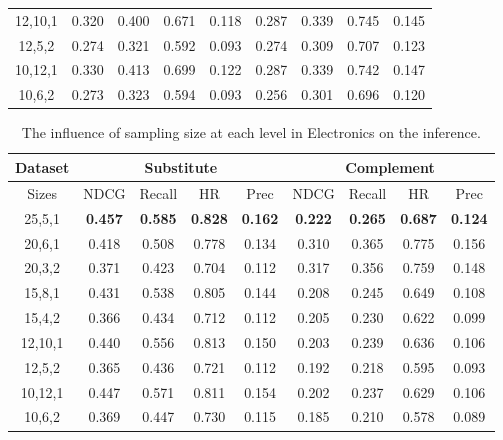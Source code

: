 \documentclass[review]{elsarticle}
\begin{document}
\begin{sloppypar}
\begin{table}[]
\begin{tabular}{c|cccc|cccc}
12,10,1 & 0.320          & 0.400          & 0.671          & 0.118          & 0.287          & 0.339         & 0.745          & 0.145          \\
12,5,2  & 0.274          & 0.321          & 0.592          & 0.093          & 0.274          & 0.309         & 0.707          & 0.123          \\
10,12,1 & 0.330          & 0.413          & 0.699          & 0.122          & 0.287          & 0.339         & 0.742          & 0.147          \\
10,6,2  & 0.273          & 0.323          & 0.594          & 0.093          & 0.256          & 0.301         & 0.696          & 0.120          \\ \hline
\end{tabular}
\label{Table Sample}
\end{table}
\begin{table}[]
\caption{The influence of sampling size at each level in Electronics on the inference.}
\small
\begin{tabular}{c|cccc|cccc}
\hline
Dataset & \multicolumn{4}{c|}{Substitute}                                    & \multicolumn{4}{c}{Complement}                                    \\ \hline
Sizes   & NDCG        & Recall      & HR          & Prec        & NDCG        & Recall      & HR          & Prec        \\ \hline
25,5,1  & \textbf{0.457} & \textbf{0.585} & \textbf{0.828} & \textbf{0.162} & \textbf{0.222} & \textbf{0.265} & \textbf{0.687} & \textbf{0.124} \\
20,6,1  & 0.418          & 0.508          & 0.778          & 0.134          & 0.310          & 0.365          & 0.775          & 0.156          \\
20,3,2  & 0.371          & 0.423          & 0.704          & 0.112          & 0.317          & 0.356          & 0.759          & 0.148          \\
15,8,1  & 0.431          & 0.538          & 0.805          & 0.144          & 0.208          & 0.245          & 0.649          & 0.108          \\
15,4,2  & 0.366          & 0.434          & 0.712          & 0.112          & 0.205          & 0.230          & 0.622          & 0.099          \\
12,10,1 & 0.440          & 0.556          & 0.813          & 0.150          & 0.203          & 0.239          & 0.636          & 0.106          \\
12,5,2  & 0.365          & 0.436          & 0.721          & 0.112          & 0.192          & 0.218          & 0.595          & 0.093          \\
10,12,1 & 0.447          & 0.571          & 0.811          & 0.154          & 0.202          & 0.237          & 0.629          & 0.106          \\
10,6,2  & 0.369          & 0.447          & 0.730          & 0.115          & 0.185          & 0.210          & 0.578          & 0.089          \\ \hline
\end{tabular}
\end{table}

\end{sloppypar}
\end{document}
